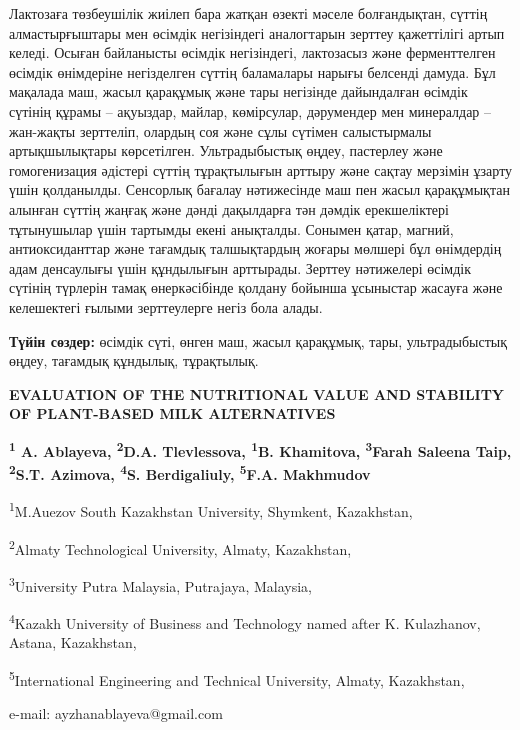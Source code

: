 Лактозаға төзбеушілік жиілеп бара жатқан өзекті мәселе болғандықтан,
сүттің алмастырғыштары мен өсімдік негізіндегі аналогтарын зерттеу
қажеттілігі артып келеді. Осыған байланысты өсімдік негізіндегі,
лактозасыз және ферменттелген өсімдік өнімдеріне негізделген сүттің
баламалары нарығы белсенді дамуда. Бұл мақалада маш, жасыл қарақұмық
және тары негізінде дайындалған өсімдік сүтінің құрамы -- ақуыздар,
майлар, көмірсулар, дәрумендер мен минералдар -- жан-жақты зерттеліп,
олардың соя және сұлы сүтімен салыстырмалы артықшылықтары көрсетілген.
Ультрадыбыстық өңдеу, пастерлеу және гомогенизация әдістері сүттің
тұрақтылығын арттыру және сақтау мерзімін ұзарту үшін қолданылды.
Сенсорлық бағалау нәтижесінде маш пен жасыл қарақұмықтан алынған сүттің
жаңғақ және дәнді дақылдарға тән дәмдік ерекшеліктері тұтынушылар үшін
тартымды екені анықталды. Сонымен қатар, магний, антиоксиданттар және
тағамдық талшықтардың жоғары мөлшері бұл өнімдердің адам денсаулығы үшін
құндылығын арттырады. Зерттеу нәтижелері өсімдік сүтінің түрлерін тамақ
өнеркәсібінде қолдану бойынша ұсыныстар жасауға және келешектегі ғылыми
зерттеулерге негіз бола алады.

{\bfseries Түйін сөздер:} өсімдік сүті, өнген маш, жасыл қарақұмық, тары,
ультрадыбыстық өңдеу, тағамдық құндылық, тұрақтылық.

\begin{articleheader}
{\bfseries EVALUATION OF THE NUTRITIONAL VALUE AND STABILITY OF PLANT-BASED
MILK ALTERNATIVES}

{\bfseries
\textsuperscript{1} A. Ablayeva\textsuperscript{\envelope },
\textsuperscript{2}D.A. Tlevlessova,
\textsuperscript{1}B. Khamitova,
\textsuperscript{3}Farah Saleena Taip,
\textsuperscript{2}S.T. Azimova,
\textsuperscript{4}S. Berdigaliuly,
\textsuperscript{5}F.A. Makhmudov
}
\end{articleheader}

\begin{affiliation}
\textsuperscript{1}M.Auezov South Kazakhstan University, Shymkent, Kazakhstan,

\textsuperscript{2}Almaty Technological University, Almaty, Kazakhstan,

\textsuperscript{3}University Putra Malaysia, Putrajaya, Malaysia,

\textsuperscript{4}Kazakh University of Business and Technology named after K. Kulazhanov, Astana, Kazakhstan,

\textsuperscript{5}International Engineering and Technical University, Almaty, Kazakhstan,

e-mail: ayzhanablayeva@gmail.com
\end{affiliation}

